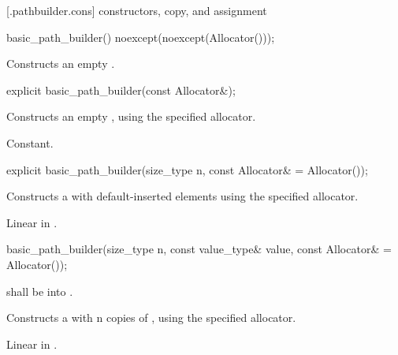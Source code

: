  [\iotwod.pathbuilder.cons] { constructors, copy, and assignment}

%
\begin{itemdecl}
basic_path_builder() noexcept(noexcept(Allocator()));
\end{itemdecl}
\begin{itemdescr}
\pnum
\effects
Constructs an empty .
\end{itemdescr}
	
%
\begin{itemdecl}
explicit basic_path_builder(const Allocator&);
\end{itemdecl}
\begin{itemdescr}
\pnum
\effects
Constructs an empty , using the specified allocator.

\pnum
\complexity
Constant.
\end{itemdescr}

%
\begin{itemdecl}
explicit basic_path_builder(size_type n, const Allocator& = Allocator());
\end{itemdecl}
\begin{itemdescr}
\pnum
\effects
Constructs a  with  default-inserted elements using the specified allocator.

\pnum
\complexity
Linear in .
\end{itemdescr}

%
\begin{itemdecl}
basic_path_builder(size_type n, const value_type& value,
  const Allocator& = Allocator());
\end{itemdecl}
\begin{itemdescr}
\pnum
\requires
{} shall be  into .

\pnum
\effects
Constructs a  with n copies of , using the specified allocator.

\pnum
\complexity
Linear in .
\end{itemdescr}


